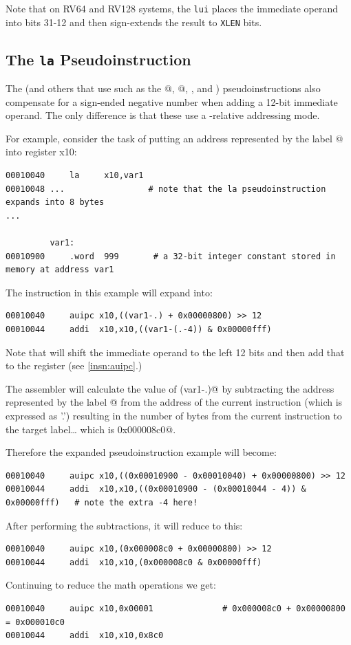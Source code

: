 %
Note that on RV64 and RV128 systems, the \texttt{lui} places the immediate operand into
bits 31-12 and then sign-extends the result to \texttt{XLEN} bits.

\subsection{The \texttt{la} Pseudoinstruction}

The \verb@la@ (and others that use \verb@auipc@ such as
the @, @, \verb@call@, and \verb@tail@) pseudoinstructions
also compensate for a sign-ended negative number when adding a 12-bit immediate
operand. The only difference is that these use a \verb@pc@-relative addressing mode.

For example, consider the task of putting an address represented by the label @
into register x10:

{\small
\begin{verbatim}
00010040     la     x10,var1
00010048 ...                 # note that the la pseudoinstruction expands into 8 bytes
...

         var1:
00010900     .word  999       # a 32-bit integer constant stored in memory at address var1
\end{verbatim}
}
The \verb@la@ instruction in this example will expand into:
{\small
\begin{verbatim}
00010040     auipc x10,((var1-.) + 0x00000800) >> 12
00010044     addi  x10,x10,((var1-(.-4)) & 0x00000fff)
\end{verbatim}
}

Note that \verb@auipc@ will shift the immediate operand to the left 12 bits and then
add that to the \verb@pc@ register (see \autoref{insn:auipc}.)

The assembler will calculate the value of \verb@(var1-.)@ by subtracting the address
represented by the label @ from the address of the current instruction
(which is expressed as '.') resulting in the number of bytes from the current instruction
to the target label\ldots{} which is \verb@0x000008c0@.

Therefore the expanded pseudoinstruction example will become:
{\small
\begin{verbatim}
00010040     auipc x10,((0x00010900 - 0x00010040) + 0x00000800) >> 12
00010044     addi  x10,x10,((0x00010900 - (0x00010044 - 4)) & 0x00000fff)   # note the extra -4 here!
\end{verbatim}
}
After performing the subtractions, it will reduce to this:
{\small
\begin{verbatim}
00010040     auipc x10,(0x000008c0 + 0x00000800) >> 12
00010044     addi  x10,x10,(0x000008c0 & 0x00000fff)
\end{verbatim}
}
Continuing to reduce the math operations we get:
{\small
\begin{verbatim}
00010040     auipc x10,0x00001              # 0x000008c0 + 0x00000800 = 0x000010c0
00010044     addi  x10,x10,0x8c0
\end{verbatim}
}

